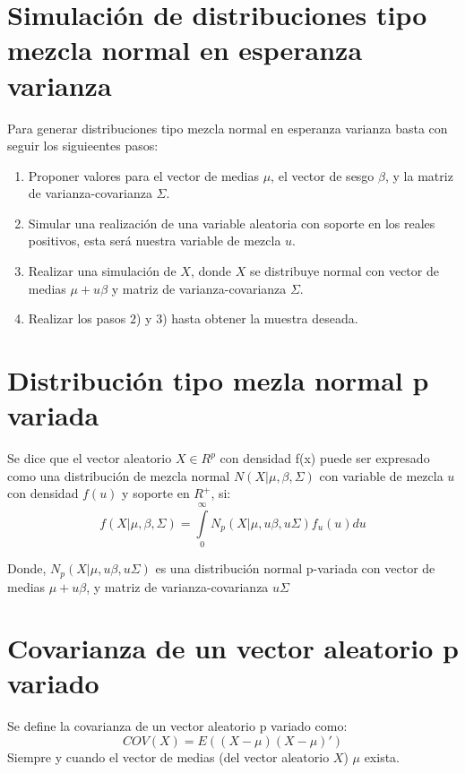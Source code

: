 
\section{Simulación de distribuciones tipo mezcla normal en esperanza varianza}
Para generar distribuciones tipo mezcla normal en esperanza varianza basta con seguir los siguieentes pasos:

\begin{enumerate}
	\item Proponer valores para el vector de medias $\mu$, el vector de sesgo $\beta$, y la matriz de varianza-covarianza $\Sigma$.	
	\item Simular una realización de una variable aleatoria con soporte en los reales positivos, esta será nuestra variable de mezcla $u$.
	\item Realizar una simulación de $X$, donde $X$ se distribuye normal con vector de medias $\mu + u\beta$ y matriz de varianza-covarianza $\Sigma$.
	\item Realizar los pasos $2$) y $3$) hasta obtener la muestra deseada.
	 
\end{enumerate}
\section{Distribución tipo mezla normal p variada}
Se dice que el vector aleatorio $X\in R^{p}$ con densidad f(x) puede ser expresado como una distribución de mezcla normal $N(X|\mu,\beta,\Sigma)$ con variable de mezcla $u$ con densidad $f(u)$ y soporte en $R^{+}$, si:
\begin{equation*}
f(X|\mu,\beta,\Sigma)=\underset{0}{\overset{\infty }{\int }}N_{p}(X|\mu,u\beta,u\Sigma)f_{u}(u)du 
\end{equation*}

Donde, $N_{p}(X|\mu,u\beta,u\Sigma)$ es una distribución normal p-variada con vector de medias $\mu+u\beta$, y matriz de varianza-covarianza $u\Sigma$

\section{Covarianza de un vector aleatorio p variado}
Se define la covarianza de un vector aleatorio p variado como:
\begin{equation*}
COV(X)=E((X-\mu)(X-\mu)')
\end{equation*}
Siempre y cuando el vector de medias (del vector aleatorio $X$) $\mu$ exista.

